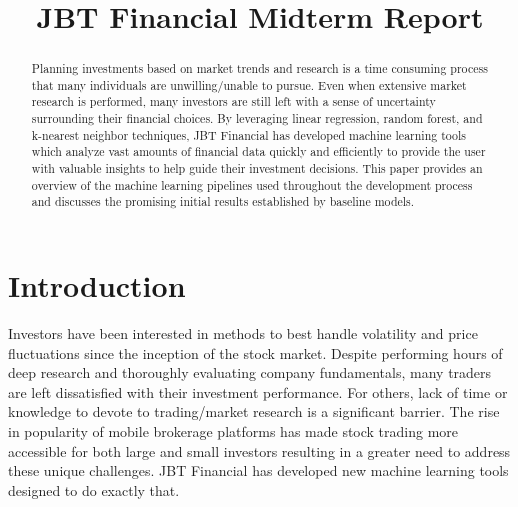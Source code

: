 \documentclass[conference]{IEEEtran}
\begin{document}
\title{JBT Financial Midterm Report\\
}

\author{
\and
{}
\and
{}
}


\maketitle

\begin{abstract}
Planning investments based on market trends and research is a time consuming process that many individuals are unwilling/unable to pursue. Even when extensive market research is performed, many investors are still left with a sense of uncertainty surrounding their financial choices. By leveraging linear regression, random forest, and k-nearest neighbor techniques, JBT Financial has developed machine learning tools which analyze vast amounts of financial data quickly and efficiently to provide the user with valuable insights to help guide their investment decisions. This paper provides an overview of the machine learning pipelines used throughout the development process and discusses the promising initial results established by baseline models.
\end{abstract}

\section{Introduction}
Investors have been interested in methods to best handle volatility and price fluctuations since the inception of the stock market. Despite performing hours of deep research and thoroughly evaluating company fundamentals, many traders are left dissatisfied with their investment performance. For others, lack of time or knowledge to devote to trading/market research is a significant barrier. The rise in popularity of mobile brokerage platforms has made stock trading more accessible for both large and small investors resulting in a greater need to address these unique challenges. JBT Financial has developed new machine learning tools designed to do exactly that. 
\end{document}
